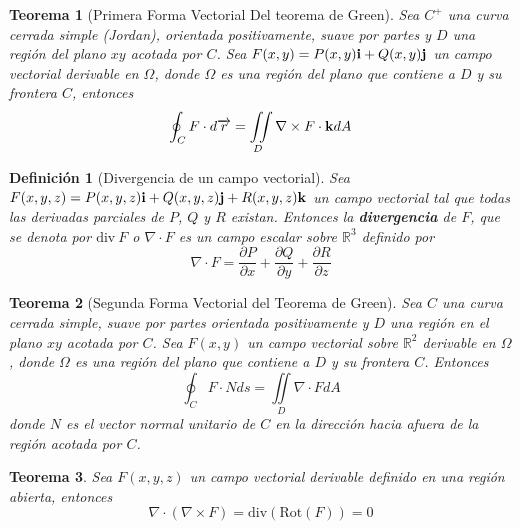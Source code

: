 \documentclass[11pt]{book}
\newcounter{Teorema}
\numberwithin{equation}{section}
\theoremstyle{plain}  %
\newtheorem{thm}{Teorema}[section]
\newtheorem{Def}{Definición}[chapter]
\begin{document}
\begin{thm}[Primera Forma Vectorial Del teorema de Green] Sea $C^{+}$ una curva cerrada simple (Jordan), orientada positivamente, suave por partes y $D$ una región del plano $xy$ acotada por $C$. Sea $F(x,y)=P(x,y){\bf i}+Q(x,y){\bf j}$ un campo vectorial derivable en $\Omega$, donde $\Omega$ es una región del plano que contiene a $D$ y su frontera $C$, entonces
	$$\oint_CF\cdot d\overrightarrow{r}=\iint\limits_D\nabla\times F\cdot{\bf k}dA$$
\end{thm}
\begin{Def}[Divergencia de un campo vectorial] 
	Sea $F(x,y,z)=P(x,y,z){\bf i}+Q(x,y,z){\bf j}+R(x,y,z){\bf k}$ un campo vectorial tal que todas las derivadas parciales de $P$, $Q$ y $R$ existan. Entonces la \textbf{divergencia} de $F$, que se denota por $\mathrm{div}\ F$ o $\nabla\cdot F$ es un campo escalar sobre $\mathbb{R}^{3}$ definido por
	$$\nabla\cdot F=\frac{\partial P}{\partial x}+\frac{\partial Q}{\partial y}+\frac{\partial R}{\partial z}$$
\end{Def}
\begin{thm}[Segunda Forma Vectorial del Teorema de Green] Sea $C$ una curva cerrada simple, suave por partes orientada positivamente y $D$ una región en el plano $xy$ acotada por $C$. Sea $F(x,y)$ un campo vectorial sobre $\mathbb{R}^{2}$ derivable en $\Omega$, donde $\Omega$ es una región del plano que contiene a $D$ y su frontera $C$. Entonces
	$$\oint_CF\cdot Nds=\iint\limits_D\nabla\cdot FdA$$
	donde $N$ es el vector normal unitario de $C$ en la dirección hacia afuera de la región acotada por $C$.
\end{thm}
\begin{thm}
Sea $F(x,y,z)$ un campo vectorial derivable definido en una
región abierta, entonces
$$\nabla\cdot(\nabla\times F)=\mathrm{div}(\mathrm{Rot}(F))=0$$
\end{thm}
\end{document}
